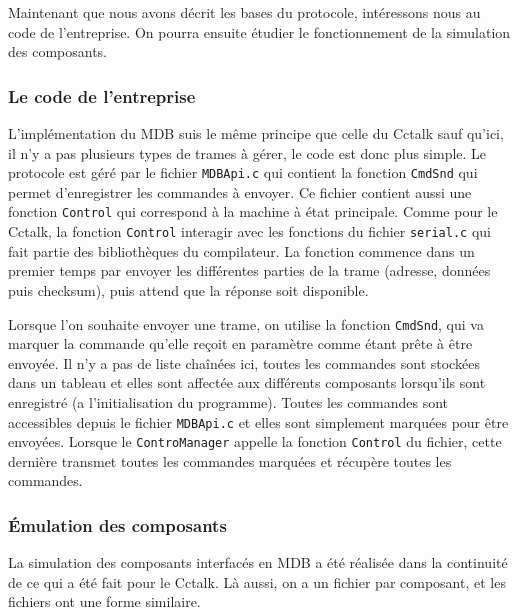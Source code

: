 \documentclass[a4paper]{article}
\begin{document}
Maintenant que nous avons décrit les bases du protocole, intéressons nous au
code de l'entreprise. On pourra ensuite étudier le fonctionnement de la
simulation des composants.

\subsubsection{Le code de l'entreprise}

L'implémentation du MDB suis le même principe que celle du Cctalk sauf qu'ici,
il n'y a pas plusieurs types de trames à gérer, le code est donc plus simple. Le
protocole est géré par le fichier \verb|MDBApi.c| qui contient la fonction
\verb|CmdSnd| qui permet d'enregistrer les commandes à envoyer. Ce fichier
contient aussi une fonction \verb|Control| qui correspond à la machine à état
principale. Comme pour le Cctalk, la fonction \verb|Control| interagir avec les
fonctions du fichier \verb|serial.c| qui fait partie des bibliothèques du
compilateur. La fonction commence dans un premier temps par envoyer les
différentes parties de la trame (adresse, données puis checksum), puis attend
que la réponse soit disponible.

Lorsque l'on souhaite envoyer une trame, on utilise la fonction \verb|CmdSnd|,
qui va marquer la commande qu'elle reçoit en paramètre comme étant prête à être
envoyée. Il n'y a pas de liste chaînées ici, toutes les commandes sont stockées
dans un tableau et elles sont affectée aux différents composants lorsqu'ils sont
enregistré (a l'initialisation du programme). Toutes les commandes sont
accessibles depuis le fichier \verb|MDBApi.c| et elles sont simplement marquées
pour être envoyées. Lorsque le \verb|ControManager| appelle la fonction
\verb|Control| du fichier, cette dernière transmet toutes les commandes marquées
et récupère toutes les commandes.

\subsubsection{Émulation des composants}

La simulation des composants interfacés en MDB a été réalisée dans la continuité
de ce qui a été fait pour le Cctalk. Là aussi, on a un fichier par composant, et
les fichiers ont une forme similaire.
\end{document}
